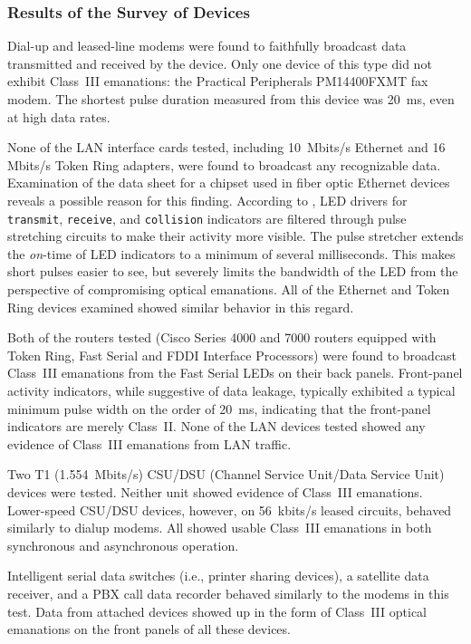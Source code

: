 \documentclass{acmtrans2e}
\begin{document}
\subsubsection{Results of the Survey of Devices}

Dial-up and leased-line modems were found to faithfully broadcast
data transmitted and received by the device.  Only one device of this
type did not 
exhibit Class~III emanations: the Practical Peripherals PM14400FXMT fax 
modem.  The shortest pulse duration measured from this device was 20~ms, 
even at high data rates.

None of the LAN interface cards tested, including 
10~Mbits/s Ethernet and 16 Mbits/s Token Ring adapters, were found to 
broadcast any recognizable data.  Examination of the data sheet for a 
chipset used in fiber optic Ethernet devices reveals a possible reason 
for this finding.  According to \cite{hp_led_data_sheet}, LED drivers 
for {\tt transmit}, {\tt receive}, and {\tt collision} indicators are filtered 
through pulse stretching circuits to make their activity more visible.  
The pulse stretcher extends the {\it on}-time of LED indicators to a minimum 
of several milliseconds.  This makes short pulses easier to see, but 
severely limits the bandwidth of the LED from the perspective of 
compromising optical emanations.  All of the Ethernet and Token Ring 
devices examined showed similar behavior in this regard.

Both of the routers tested (Cisco Series 4000 and 7000 routers equipped 
with Token Ring, Fast Serial and FDDI Interface Processors) were found 
to broadcast Class~III emanations from the Fast Serial
LEDs on their back panels.  Front-panel activity indicators, while 
suggestive of data leakage, typically exhibited a typical minimum pulse 
width on the order of 20~ms, indicating that the front-panel indicators
are merely Class~II.  None of the LAN
devices tested showed any evidence of Class~III emanations from LAN traffic.

Two T1 (1.554~Mbits/s) CSU/DSU (Channel Service Unit/Data Service Unit)
devices were tested.  Neither unit showed evidence of Class~III 
emanations.  Lower-speed CSU/DSU devices, however, on 56~kbits/s leased
circuits, behaved similarly to dial\-up modems.  All showed usable
Class~III emanations in both synchronous and asynchronous operation.

Intelligent serial data switches (i.e., printer sharing devices), a
satellite data receiver, and a PBX call
data recorder behaved similarly to the modems in this test.  Data from 
attached devices showed up in the form of Class~III optical emanations
on the front panels of all these devices.
\end{document}
